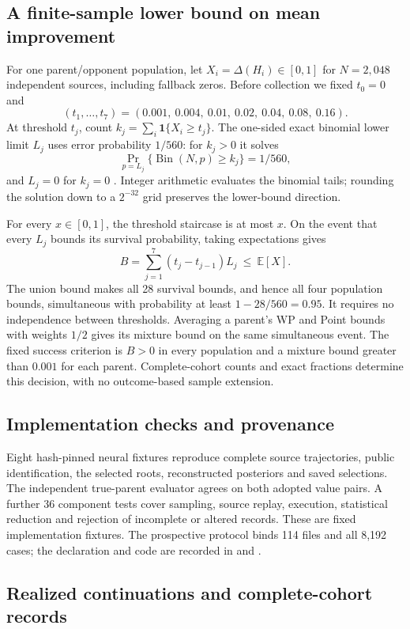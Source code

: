 \subsection{A finite-sample lower bound on mean improvement}
For one parent/opponent population, let $X_i=\Delta(H_i)\in[0,1]$ for
$N=2,048$ independent sources, including fallback zeros. Before collection we
fixed $t_0=0$ and
\[
 (t_1,\ldots,t_7)=
 (0.001,\ 0.004,\ 0.01,\ 0.02,\ 0.04,\ 0.08,\ 0.16).
\]
At threshold $t_j$, count $k_j=\sum_i\mathbf{1}\{X_i\geq t_j\}$.
The one-sided exact binomial lower limit $L_j$ uses error probability $1/560$:
for $k_j>0$ it solves
\[
 \Pr_{p=L_j}\{\operatorname{Bin}(N,p)\geq k_j\}=1/560,
\]
and $L_j=0$ for $k_j=0$ \cite{nist2015exactbinomial}. Integer arithmetic evaluates
the binomial tails; rounding the solution down to a $2^{-32}$ grid preserves
the lower-bound direction.

For every $x\in[0,1]$, the threshold staircase is at most $x$. On the event
that every $L_j$ bounds its survival probability, taking expectations gives
\[
 B=\sum_{j=1}^{7}(t_j-t_{j-1})L_j
 \ \leq\ \mathbb{E}[X].
\]
The union bound makes all 28 survival bounds, and hence all four population
bounds, simultaneous with probability at least $1-28/560=0.95$. It requires
no independence between thresholds. Averaging a parent's WP and Point bounds
with weights $1/2$ gives its mixture bound on the same simultaneous event.
The fixed success criterion is $B>0$ in every population and a mixture bound
greater than $0.001$ for each parent. Complete-cohort counts and exact fractions
determine this decision, with no outcome-based sample extension.

\subsection{Implementation checks and provenance}
Eight hash-pinned neural fixtures reproduce complete source trajectories,
public identification, the selected roots, reconstructed posteriors and saved
selections. The independent true-parent evaluator agrees on both adopted
value pairs. A further 36 component tests cover sampling, source replay,
execution, statistical reduction and rejection of incomplete or altered
records. These are fixed implementation fixtures. The prospective protocol
binds 114 files and all 8,192 cases; the declaration and code are recorded in
 and
.


\subsection{Realized continuations and complete-cohort records}
\label{app:uniform-outcomes}
\begin{table}[htbp]
\centering\small

\caption{Descriptive paired realized controller-minus-parent differences on
the 8,192-source cohort. These are observed continuation outcomes, not the
conditional-expectation estimates used for the primary bounds.}
\label{tab:uniform-actual}
\end{table}

